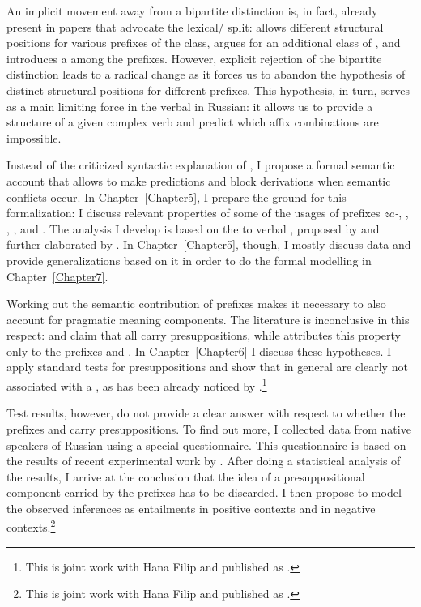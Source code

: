 An implicit movement away from a bipartite distinction is, in fact, already present in papers that advocate the lexical/ split: \citet{Svenonius:04b} allows different structural positions for various prefixes of the  class, \citet{Tatevosov:07} argues for an additional class of , and \citet{Tatevosov:09} introduces a  among the  prefixes. However, explicit rejection of the bipartite distinction leads to a radical change as it forces us to abandon the hypothesis of distinct structural positions for different prefixes. This hypothesis, in turn, serves as a main limiting force in the  verbal  in Russian: it allows us to provide a structure of a given complex verb and predict which affix combinations are impossible.

Instead of the criticized syntactic explanation of , I propose a formal semantic account that allows to make predictions and block derivations when semantic conflicts occur. In Chapter~\ref{Chapter5}, I prepare the ground for this formalization: I discuss relevant properties of some of the usages of prefixes \textit{\mbox{za-}}, , , , and . The analysis I develop is based on the  to verbal , proposed by \citet{Filip:08} and further elaborated by \citet{Kagan:12, Kagan:book}. In Chapter~\ref{Chapter5}, though, I mostly discuss data and provide generalizations based on it in order to do the formal modelling in Chapter~\ref{Chapter7}.

Working out the semantic contribution of prefixes makes it necessary to also account for pragmatic meaning components. The literature is inconclusive in this respect: \citet{Paducheva:96} and \citet{Romanova:06} claim that all  carry presuppositions, while \citet{Kagan:book} attributes this property only to the prefixes  and . In Chapter~\ref{Chapter6} I discuss these hypotheses. I apply standard tests for presuppositions and show that  in general are clearly not associated with a , as has been already noticed by \citet{Gronn:04}.\footnote{This is joint work with Hana Filip and published as \citealt{ZinovaFilip:14}.}

Test results, however, do not provide a clear answer with respect to whether the prefixes  and  carry presuppositions. To find out more, I collected data from native speakers of Russian using a special questionnaire. This questionnaire is based on the results of recent experimental work by \citet{Chemla:09}. After doing a statistical analysis of the results, I arrive at the conclusion that the idea of a presuppositional component carried by the prefixes has to be discarded. I then propose to model the observed inferences as entailments in positive contexts and  in negative contexts.\footnote{This is joint work with Hana Filip and published as \citealt{ZinovaFilip:SALT}.}

